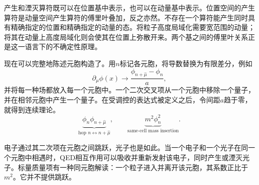 产生和湮灭算符既可以在位置基中表示，也可以在动量基中表示。位置空间的产生算符是动量空间产生算符的傅里叶叠加，反之亦然。不存在一个算符能产生同时具有精确指定的位置和精确指定的动量的态。将粒子高度局域化需要宽范围的动量；将其在动量上高度局域化则会使其在位置上弥散开来。两个基之间的傅里叶关系正是这一语言下的不确定性原理。

\begin{classroomqa}
\end{classroomqa}

现在可以完整地陈述元胞构造了。用\(n\)标记各元胞，将导数替换为有限差分，例如
\begin{equation}
\partial_\mu\phi(x)
\longrightarrow
\frac{\phi_{n+\hat\mu}-\phi_n}{a},
\end{equation}
并将每一种场都放入每一个元胞中。一个二次交叉项从一个元胞中移除一个量子，并在相邻元胞中产生一个量子。在受调控的表达式被定义之后，令间距\(a\)趋于零，就得到连续理论。
\begin{equation}
\underbrace{\phi_n\phi_{n+\hat\mu}}_{\text{hop }n\leftrightarrow n+\hat\mu},
\qquad
\underbrace{m^2\phi_n^2}_{\text{same-cell mass insertion}}.
\end{equation}

\begin{classroomqa}
\end{classroomqa}

电子通过其二次项在元胞之间跳跃，光子也是如此。当一个电子和一个光子在同一个元胞中相遇时，QED相互作用可以吸收并重新发射该电子，同时产生或湮灭光子。标量质量项有一种同元胞解读：一个粒子进入并离开该元胞，其系数正比于\(m^2\)。它并不提供跳跃。

\begin{classroomqa}
\end{classroomqa}

\begin{classroomqa}
\end{classroomqa}

